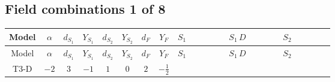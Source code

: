 \documentclass[8pt]{article}
\begin{document}
\begin{landscape}
\subsection*{Field combinations 1 of 8}
\begin{longtable}{@{}cccccccc >{\raggedright\arraybackslash}p{0.21\linewidth} >{\raggedright\arraybackslash}p{0.21\linewidth} >{\raggedright\arraybackslash}p{0.21\linewidth}@{}}
\toprule
Model & $\alpha$ & $d_{S_1}$ & $Y_{S_1}$ & $d_{S_2}$ & $Y_{S_2}$ & $d_F$ & $Y_F$ & $S_1$ & $S_1\,D$ & $S_2$ \\
\midrule
\endfirsthead
\toprule
Model & $\alpha$ & $d_{S_1}$ & $Y_{S_1}$ & $d_{S_2}$ & $Y_{S_2}$ & $d_F$ & $Y_F$ & $S_1$ & $S_1\,D$ & $S_2$ \\
\midrule
\endhead
T3-D & $-2$ & $3$ & $-1$ & $1$ & $0$ & $2$ & $-\frac{1}{2}$ & \scriptsize\adjustbox{max width=\linewidth}{$\begin{gathered} +\frac{2 \hbar  \overline{y_{1,i_1,r_1}} \overline{y_{1,i_2,r_2}} S_{1,j_2}^2 y_{1,i_1,r_2} y_{1,i_2,r_1} \left(S_{1,j_1}{}^{\dagger }\right){}^2}{3 \epsilon } \\ +C_{S_1^\dagger S_1} S_{1,j_1} S_{1,j_1}{}^{\dagger } \\ -\frac{C_{S_1^\dagger S_1} \hbar  \overline{y_{1,i_1,r_1}} S_{1,j_1} y_{1,i_1,r_1} S_{1,j_1}{}^{\dagger }}{\sqrt{3}}\end{gathered}$} & \scriptsize\adjustbox{max width=\linewidth}{$\begin{gathered} +D_{\mu _1}\left(S_{1,j_1}\right){}^{\dagger } D_{\mu _1}\left(S_{1,j_1}\right)\end{gathered}$} & \scriptsize\adjustbox{max width=\linewidth}{$\begin{gathered} -\frac{2 \hbar  \overline{y_{2,i_1,r_1}} \overline{y_{2,i_2,r_2}} S_2^2 y_{2,i_1,r_2} y_{2,i_2,r_1} \left(S_2{}^{\dagger }\right){}^2}{\epsilon } \\ +C_{S_2^\dagger S_2} S_2 S_2{}^{\dagger } \\ -C_{S_2^\dagger S_2} \hbar  \overline{y_{2,i_1,r_1}} S_2 y_{2,i_1,r_1} S_2{}^{\dagger }\end{gathered}$} \\

\end{longtable}
\end{landscape}
\end{document}
